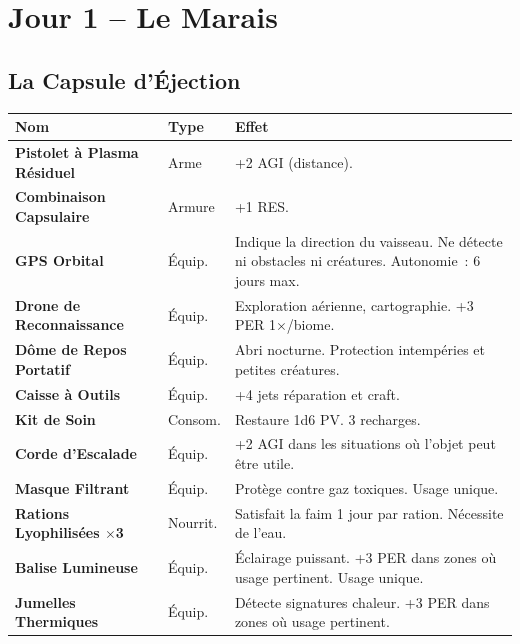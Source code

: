 \documentclass[9pt,a4paper]{article}
\begin{document}
\section*{Jour 1 -- Le Marais}

\subsection*{La Capsule d'\'Ejection}

\noindent{}\vspace{6pt}

\vspace{2pt}

\noindent\scriptsize
\begin{tabularx}{\linewidth}{|>{\bfseries\centering\arraybackslash}p{3.2cm}|>{\centering\arraybackslash}p{1.2cm}|L|}
\hline
{} \normalfont\textbf{Nom} & \textbf{Type} & \textbf{Effet} \\
\hline
{} Pistolet \`a Plasma R\'esiduel & Arme & +2 AGI (distance). \\
\hline
{} Combinaison Capsulaire & Armure & +1 RES.\\
\hline
GPS Orbital & \'Equip. & Indique la direction du vaisseau. Ne d\'etecte ni obstacles ni cr\'eatures. Autonomie~: 6 jours max. \\
\hline
Drone de Reconnaissance & \'Equip. & Exploration a\'erienne, cartographie. +3 PER 1$\times$/biome. \\
\hline
D\^ome de Repos Portatif & \'Equip. & Abri nocturne. Protection intemp\'eries et petites cr\'eatures. \\
\hline
Caisse \`a Outils & \'Equip. & +4 jets r\'eparation et craft. \\
\hline
Kit de Soin & Consom. & Restaure 1d6 PV. 3 recharges. \\
\hline
Corde d'Escalade & \'Equip. & +2 AGI dans les situations où l'objet peut être utile. \\
\hline
Masque Filtrant & \'Equip. & Prot\`ege contre gaz toxiques. Usage unique. \\
\hline
Rations Lyophilis\'ees $\times$3 & Nourrit. & Satisfait la faim 1 jour par ration. N\'ecessite de l'eau. \\
\hline
Balise Lumineuse & \'Equip. & \'Eclairage puissant. +3 PER dans zones où usage pertinent. Usage unique. \\
\hline
Jumelles Thermiques & \'Equip. & D\'etecte signatures chaleur. +3 PER dans zones où usage pertinent. \\
\hline
\end{tabularx}
\end{document}

